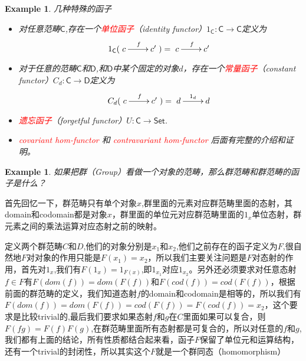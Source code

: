 \documentclass{article}
\newtheorem{example}[theorem]{Example}
\newcommand*{\cat}[1]{\textsf{#1}\xspace}
\newcommand{\id}{1}
\newcommand*{\xfunc}[4]{{#2}\colon{#3}{#1}{#4}}
\newcommand*{\func}[3]{\xfunc{\to}{#1}{#2}{#3}}
\newcommand{\redt}[1]{\textcolor{red}{#1}}
\begin{document}
\begin{example}
\rm 几种特殊的函子
	\begin{itemize}
		\item 对任意范畴$\cat{C}$,存在一个\redt{单位函子}（identity functor）$\func{\id_{\cat{C}}}{\cat{C}}{\cat{C}}$定义为\[\id_{\cat{C}}(\xymatrix{c\ar[r]^f&c'})=\xymatrix{c\ar[r]^f&c'}\]
		\item 对于任意的范畴$\cat{C}$和$\cat{D}$,和$\cat{D}$中某个固定的对象$d$，存在一个\redt{常量函子}（constant functor）$\func{C_{d}}{\cat{C}}{\cat{D}}$定义为\[C_{d}(\xymatrix{c\ar[r]^f&c'})=\xymatrix{d\ar[r]^{\id_d}&d}\]
		\item \redt{遗忘函子}（forgetful functor）$\func{U}{\cat{C}}{\cat{Set}}$.
		\item \redt{covariant hom-functor} 和 \redt{contravariant hom-functor} 后面有完整的介绍和证明。
	\end{itemize}
	
\end{example}


\begin{example}
\rm 如果把群（Group）看做一个对象的范畴，那么群范畴和群范畴的函子是什么？
\end{example}
首先回忆一下，群范畴只有单个对象$x$,群里面的元素对应群范畴里面的态射，其domain和codomain都是对象$x$，群里面的单位元对应群范畴里面的$1_x$单位态射，群元素之间的乘法运算对应态射之前的映射。

定义两个群范畴$C$和$D$,他们的对象分别是$x_1$和$x_2$,他们之前存在的函子定义为$F$,很自然地$F$对对象的作用只能是$F(x_1) = x_2$，所以我们主要关注问题是$F$对态射的作用，首先对$1_x$,我们有$F(1_x)=1_{F(x)}$,即$1_{x_1}$对应$1_{x_2}$。另外还必须要求对任意态射$f \in F$有$F(dom(f))=dom(F(f))$和$F(cod(f))=cod(F(f))$，根据前面的群范畴的定义，我们知道态射$f$的domain和codomain是相等的，所以我们有$F(dom(f))=dom(F(f))=cod(F(f))=F(cod(f))=x_2$，这个要求是比较trivial的,最后我们要求如果态射$f$和$g$在$C$里面如果可以复合，则$F(fg)=F(f)F(g)$,在群范畴里面所有态射都是可复合的，所以对任意的$f$和$g$,我们都有上面的结论，所有性质都结合起来看，函子$F$保留了单位元和运算结构，还有一个trivial的封闭性，所以其实这个$F$就是一个群同态（homomorphism）
\end{document}
